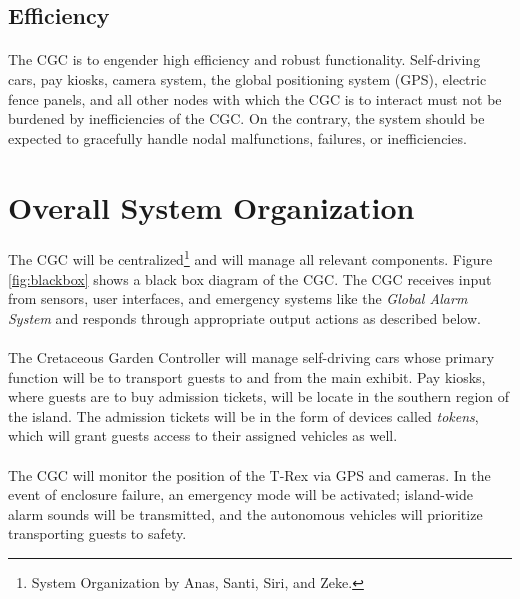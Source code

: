 \documentclass[12pt]{article}
\begin{document}
	\subsection{Efficiency}\label{eff}
	\paragraph{} The CGC is to engender high efficiency and robust functionality. 
	Self-driving cars, pay kiosks, camera system, the global positioning system (GPS), 
	electric fence panels, and all other nodes with which the CGC is to interact 
	must not be burdened by inefficiencies of the CGC. On the contrary, the system
	should be expected to gracefully handle nodal malfunctions, failures, or
	inefficiencies.




\section{Overall System Organization} \label{sys}
\paragraph{} The CGC will be centralized\footnote{System Organization 
by Anas, Santi, Siri, and Zeke.} and will manage all relevant components. Figure 
\ref{fig:blackbox} shows a black box diagram of the CGC. The CGC receives input 
from sensors, user interfaces, and emergency systems like the \textit{Global 
Alarm System} and responds through appropriate output actions as described 
below.

\paragraph{} The Cretaceous Garden Controller will manage self-driving cars whose primary
function will be to transport guests to and from the main exhibit. Pay kiosks, where guests 
are to buy admission tickets, will be locate in the southern region of the island. The admission 
tickets will be in the form of devices called \textit{tokens}, which will grant guests 
access to their assigned vehicles as well.

\paragraph{} The CGC will monitor the position of the T-Rex via GPS and
cameras. In the event of enclosure failure, an emergency mode will be activated;
island-wide alarm sounds will be transmitted, and the autonomous vehicles will
prioritize transporting guests to safety.
\end{document}
